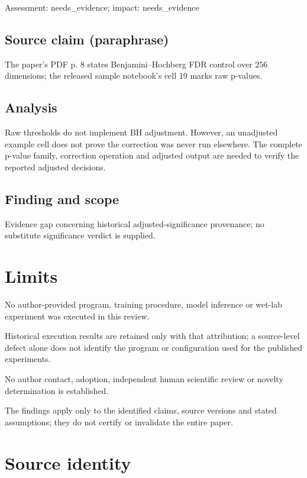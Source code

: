 \documentclass[11pt]{article}
\begin{document}
Assessment: needs\_evidence; impact: needs\_evidence

\subsection*{Source claim (paraphrase)}

The paper's PDF p. 8 states Benjamini–Hochberg FDR control over \(256\) dimensions; the released sample notebook's cell 19 marks raw p-values.

\subsection*{Analysis}

Raw thresholds do not implement BH adjustment. However, an unadjusted example cell does not prove the correction was never run elsewhere. The complete p-value family, correction operation and adjusted output are needed to verify the reported adjusted decisions.

\subsection*{Finding and scope}

Evidence gap concerning historical adjusted-significance provenance; no substitute significance verdict is supplied.

\section*{Limits}

No author-provided program, training procedure, model inference or wet-lab experiment was executed in this review.\par

Historical execution results are retained only with that attribution; a source-level defect alone does not identify the program or configuration used for the published experiments.\par

No author contact, adoption, independent human scientific review or novelty determination is established.\par

The findings apply only to the identified claims, source versions and stated assumptions; they do not certify or invalidate the entire paper.\par

\section*{Source identity}
\end{document}
